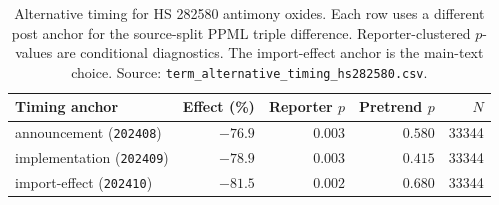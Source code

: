\begin{table}[H]
\centering
\caption{Alternative timing for HS 282580 antimony oxides. Each row uses a
different post anchor for the source-split PPML triple difference.
Reporter-clustered $p$-values are conditional diagnostics. The import-effect
anchor is the main-text choice. Source:
\texttt{term\_alternative\_timing\_hs282580.csv}.}
\label{tab:timing}
\footnotesize
\begin{tabular}{lrrrr}
\toprule
Timing anchor & Effect (\%) & Reporter $p$ & Pretrend $p$ & $N$ \\
\midrule
announcement (\texttt{202408})    & $-76.9$ & $0.003$ & $0.580$ & 33344 \\
implementation (\texttt{202409})  & $-78.9$ & $0.003$ & $0.415$ & 33344 \\
import-effect (\texttt{202410})   & $-81.5$ & $0.002$ & $0.680$ & 33344 \\
\bottomrule
\end{tabular}
\end{table}
